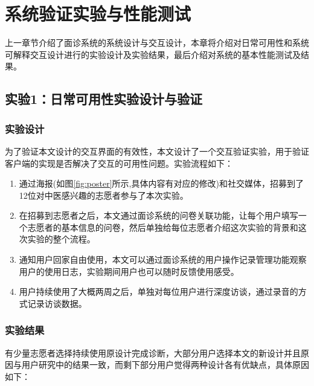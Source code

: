 \chapter{系统验证实验与性能测试}

上一章节介绍了面诊系统的系统设计与交互设计，本章将介绍对日常可用性和系统可解释交互设计进行的实验设计及实验结果，最后介绍对系统的基本性能测试及结果。

\section{实验1：日常可用性实验设计与验证}

\subsection{实验设计}
为了验证本文设计的交互界面的有效性，本文设计了一个交互验证实验，用于验证客户端的实现是否解决了交互的可用性问题。实验流程如下：
\begin{enumerate}


    \item 通过海报(如图\ref{fig:poster}所示,具体内容有对应的修改)和社交媒体，招募到了12位对中医感兴趣的志愿者参与了本次实验。

    \item 在招募到志愿者之后，本文通过面诊系统的问卷关联功能，让每个用户填写一个志愿者的基本信息的问卷，然后单独给每位志愿者介绍这次实验的背景和这次实验的整个流程。

    \item 通知用户回家自由使用，本文可以通过面诊系统的用户操作记录管理功能观察用户的使用日志，实验期间用户也可以随时反馈使用感受。

    \item 用户持续使用了大概两周之后，单独对每位用户进行深度访谈，通过录音的方式记录访谈数据。

\end{enumerate}

\subsection{实验结果}



有少量志愿者选择持续使用原设计完成诊断，大部分用户选择本文的新设计并且原因与用户研究中的结果一致，而剩下部分用户觉得两种设计各有优缺点，具体原因如下：


